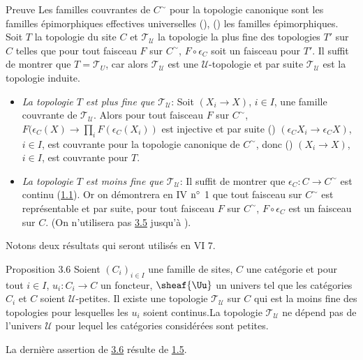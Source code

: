 \begin{enonce*}[remark]{Preuve}
Les familles couvrantes de $C^{\sim}$ pour la topologie canonique
sont les familles épimorphiques effectives universelles
(), \ie () les familles
épimorphiques. Soit $T$ la topologie du site $C$ et
$𝒯_{𝒰}$ la topologie la plus fine des topologies $T'$ sur
$C$ telles que pour tout faisceau $F$ sur $C^{\sim}$, $F\circ
\epsilon_C$ soit un faisceau pour $T'$. Il suffit de montrer que
$T=𝒯_U$, car alors $𝒯_{𝒰}$ est une $𝒰$-topologie
et par suite $𝒯_{𝒰}$ est la topologie induite.
\begin{itemize}
\item[A)] \emph{La topologie $T$ est plus fine que $𝒯_{𝒰}$}:
Soit $(X_i\rightarrow X)$, $i\in I$, une famille couvrante de
$𝒯_{𝒰}$. Alors pour tout faisceau $F$ sur $C^{\sim}$,
$F(\epsilon_C(X)\rightarrow\prod_i F(\epsilon_C(X_i))$ est injective
et par suite () $(\epsilon_C X_i\rightarrow
\epsilon_CX)$, $i\in I$, est couvrante pour la topologie canonique
de $C^{\sim}$, donc () $(X_i\rightarrow X)$, $i\in
I$, est couvrante pour $T$.

\item[B)] \emph{La topologie $T$ est moins fine que
$𝒯_{𝒰}$}: Il suffit de montrer que
$\epsilon_C:C\rightarrow C^{\sim}$ est continu (\hyperref[III.def1.1]{1.1}).
Or on démontrera en IV ${\rm n^{\circ}}$ 1 que tout faisceau sur
$C^{\sim}$ est représentable et par suite, pour tout faisceau
$F$ sur $C^{\sim}$, $F\circ \epsilon_C$ est un faisceau sur $C$. (On
n'utilisera pas \hyperref[III.prop3.5]{3.5} jusqu'à ).
\end{itemize}
Notons deux résultats qui seront utilisés en VI 7.
\end{enonce*}

\begin{enonce*}{Proposition 3.6}
Soient $(C_i)_{i\in I}$ une famille de sites, $C$ une catégorie
et pour tout $i\in I$, $u_i:C_i\rightarrow C$ un foncteur,
$\sheaf{\Uu}$ un univers tel que les catégories $C_i$ et $C$
soient $𝒰$-petites. Il existe une topologie
$𝒯_{𝒰}$ sur $C$ qui est la moins fine des topologies pour
lesquelles les $u_i$ soient continus.La topologie $𝒯_{𝒰}$
ne dépend pas de l'univers $𝒰$ pour lequel les
catégories considérées sont petites.
\end{enonce*}

La dernière assertion de \hyperref[III.prop3.6]{3.6} résulte de
\hyperref[III.prop1.5]{1.5}.

